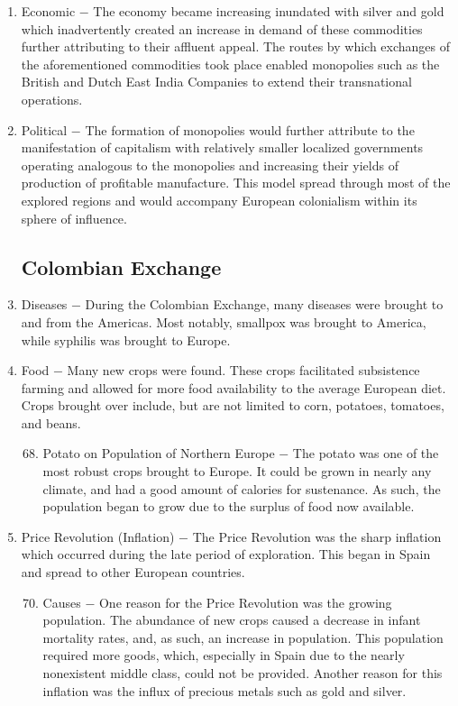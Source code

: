 \documentclass[12pt]{article}
\begin{document}
\begin{enumerate}
\item Economic $-$ The economy became increasing inundated with silver and gold which inadvertently created an increase in demand of these commodities further attributing to their affluent appeal. The routes by which exchanges of the aforementioned commodities took place enabled monopolies such as the British and Dutch East India Companies to extend their transnational operations.

\item Political $-$ The formation of monopolies would further attribute to the manifestation of capitalism with relatively smaller localized governments operating analogous to the monopolies and increasing their yields of production of profitable manufacture. This model spread through most of the explored regions and would accompany European colonialism within its sphere of influence.

\subsection{Colombian Exchange} 

\item Diseases $-$ During the Colombian Exchange, many diseases were brought to and from the Americas. Most notably, smallpox was brought to America, while syphilis was brought to Europe.

\item Food $-$ Many new crops were found. These crops facilitated subsistence farming and allowed for more food availability to the average European diet. Crops brought over include, but are not limited to corn, potatoes, tomatoes, and beans.

\begin{enumerate}[label=\arabic{*}.]
\setcounter{enumii}{67}
\item Potato on Population of Northern Europe $-$ The potato was one of the most robust crops brought to Europe. It could be grown in nearly any climate, and had a good amount of calories for sustenance. As such, the population began to grow due to the surplus of food now available.
\end{enumerate}
\setcounter{enumi}{68}
\item Price Revolution (Inflation) $-$ The Price Revolution was the sharp inflation which occurred during the late period of exploration. This began in Spain and spread to other European countries.

\begin{enumerate}[label=\arabic{*}.]
\setcounter{enumii}{69}
\item Causes $-$ One reason for the Price Revolution was the growing population. The abundance of new crops caused a decrease in infant mortality rates, and, as such, an increase in population. This population required more goods, which, especially in Spain due to the nearly nonexistent middle class, could not be provided. Another reason for this inflation was the influx of precious metals such as gold and silver.


\end{enumerate}
\end{enumerate}
\end{document}
